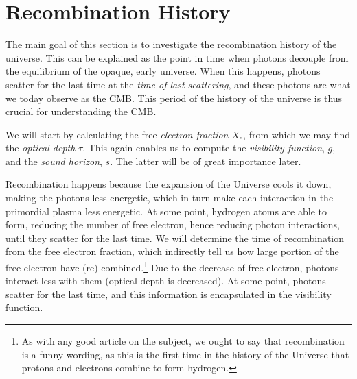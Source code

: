 \section{Recombination History}\label{sec:m2}

The main goal of this section is to investigate the recombination history of the universe. This can be explained as the point in time when photons decouple from the equilibrium of the opaque, early universe.  When this happens, photons scatter for the last time at the \textit{time of last scattering}, and these photons are what we today observe as the CMB. This period of the history of the universe is thus crucial for understanding the CMB. 

We will start by calculating the free \textit{electron fraction} $X_e$, from which we may find the \textit{optical depth} $\tau$. This again enables us to compute the \textit{visibility function}, $g$, and the \textit{sound horizon}, $s$. The latter will be of great importance later. 

Recombination happens because the expansion of the Universe cools it down, making the photons less energetic, which in turn make each interaction in the primordial plasma less energetic. At some point, hydrogen atoms are able to form, reducing the number of free electron, hence reducing photon interactions, until they scatter for the last time. We will determine the time of recombination from the free electron fraction, which indirectly tell us how large portion of the free electron have (re)-combined.\footnote{As with any good article on the subject, we ought to say that recombination is a funny wording, as this is the first time in the history of the Universe that protons and electrons combine to form hydrogen.} Due to the decrease of free electron, photons interact less with them (optical depth is decreased). At some point, photons scatter for the last time, and this information is encapsulated in the visibility function. 






